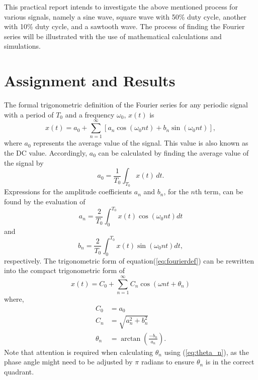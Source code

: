 \documentclass[a4paper, onecolumn, 12pt]{IEEEtran}
\begin{document}
This practical report intends to investigate the above mentioned process for various signals, namely a sine wave, square wave with 50\% duty cycle, another with 10\% duty cycle, and a sawtooth wave. The process of finding the Fourier series will be illustrated with the use of mathematical calculations and simulations.

\newpage
\section{Assignment and Results}
\label{sec:assignment and results}

The formal trigonometric definition of the Fourier series for any periodic signal with a period of $T_0$ and a frequency $\omega_0$, $x(t)$ is \cite{eli}
\begin{equation}
\label{eq:fourierdef}
    x(t) = a_0 + \sum_{n=1}^{\infty}[a_n\cos (\omega_0 nt) + b_n\sin(\omega_0 nt)],
\end{equation}
where $a_0$ represents the average value of the signal. This value is also known as the DC value.\cite{eli} Accordingly, $a_0$ can be calculated by finding the average value of the signal by\cite{eli}
\begin{equation}
\label{eq:a0def}
    a_0 = \frac{1}{T_0}\int_{T_0}x(t)\,dt.
\end{equation}
Expressions for the amplitude coefficients $a_n$ and $b_n$, for the $n$th term, can be found by the evaluation of 
\begin{equation}
\label{eq:andef}
    a_n = \frac{2}{T_0} \int_{0}^{T_0} x(t) \cos(\omega_0 nt) dt
\end{equation}
and
\begin{equation}
\label{eq:bndef}
    b_n = \frac{2}{T_0} \int_{0}^{T_0} x(t) \sin(\omega_0 nt) dt,
\end{equation}
respectively.\cite{eli}
The trigonometric form of equation(\ref{eq:fourierdef}) can be rewritten into the compact trigonometric form of\cite{eli}
\begin{equation}
\label{eq:compactfourier}
    x(t) = C_0 + \sum_{n=1}^{\infty} C_n\cos(\omega nt + \theta_n)
\end{equation}
where, 
\begin{align}
C_0 &= a_0 \\
C_n &= \sqrt{a_n^2 + b_n^2} \label{eq:Cn} \\
\theta_n &= \arctan\left(\frac{-b_n}{a_n}\right) \label{eq:theta_n}.
\end{align}
Note that attention is required when calculating $\theta_n$ using (\ref{eq:theta_n}), as the phase angle might need to be adjusted by $\pi$ radians to ensure $\theta_n$ is in the correct quadrant.\\
\end{document}
